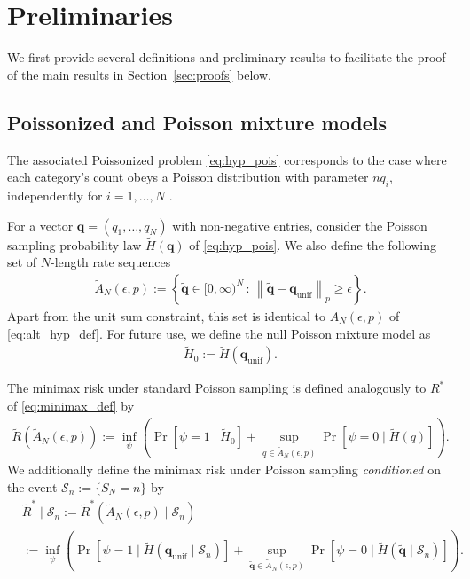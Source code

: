 \documentclass[11pt]{article}
\numberwithin{equation}{section}
\newcommand{\unif}{\mathrm{unif}}
\newcommand{\Scal}{\mathcal{S}}
\newcommand{\Prp}[1]{\Pr\left[#1 \right]}
\begin{document}
\section{Preliminaries}
\label{sec:preliminaries}
We first provide several definitions and preliminary results to facilitate the proof of the main results in Section~\ref{sec:proofs} below.

\subsection{Poissonized and Poisson mixture models}
The associated Poissonized problem \eqref{eq:hyp_pois}
corresponds to the case where each category's count obeys a Poisson distribution with parameter $n q_i$, independently for $i=1,\ldots,N$ \cite{morris1975central,jacquet1998analytical,aldous2013probability}. 

For a vector $\mathbf{q} = (q_1,\ldots,q_N)$ with non-negative entries, consider the Poisson sampling probability law $\tilde{H}(\mathbf{q})$ of \eqref{eq:hyp_pois}. 
%
We also define the following set of $N$-length rate sequences 
\begin{align*}
    \tilde{A}_N(\epsilon,p) := \left\{ \tilde{\mathbf{q}} \in {[0,\infty)}^N \, :\, \left\| \tilde{\mathbf{q}} - \mathbf{q}_{\unif} \right\|_p \geq \epsilon \right\}.
\end{align*}
Apart from the unit sum constraint, this set is identical to $A_N(\epsilon,p)$ of \eqref{eq:alt_hyp_def}. For future use, we define the null Poisson mixture model as
\begin{align*}
    \tilde{H}_0 := \tilde{H}(\mathbf{q}_{\unif}).
\end{align*}

The minimax risk under standard Poisson sampling is defined analogously to $R^*$ of \eqref{eq:minimax_def} by 
\begin{align}
\label{eq:minimax_tilde_def}
\tilde{R}(\tilde{A}_N(\epsilon,p)) := \inf_{\psi} \left( \Prp{\psi=1 \mid \tilde{H}_0} + \sup_{q \in \tilde{A}_N(\epsilon,p)} \Prp{\psi = 0 \mid \tilde{H}(q)} \right).
\end{align}
We additionally define the minimax risk under Poisson sampling \emph{conditioned} on the event $\Scal_n := \{S_N=n\}$ by 
\begin{align}
    \label{eq:minimax_tilde_conditioned_def}
& \tilde{R}^*\mid \Scal_n := \tilde{R}^*(\tilde{A}_N(\epsilon,p) \mid \Scal_n) \\
& := \inf_{\psi} \left( \Prp{\psi=1 \mid \tilde{H}(\mathbf{q}_{\unif} \mid \Scal_n)} + \sup_{\tilde{\mathbf{q}} \in \tilde{A}_N(\epsilon,p)} \Prp{\psi = 0 \mid \tilde{H}(\tilde{\mathbf{q}} \mid \Scal_n)} \right). \nonumber
\end{align}
\end{document}
